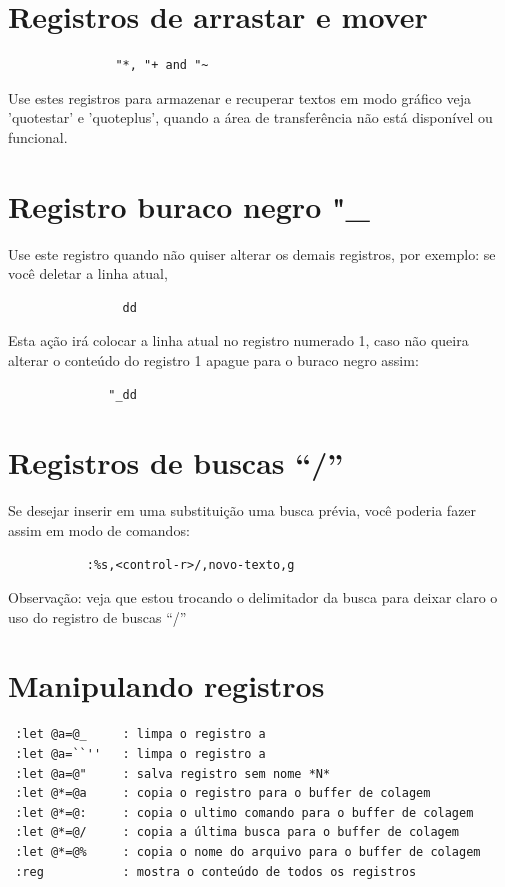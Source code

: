 \documentclass[10pt,a4paper,openany]{book}
\begin{document}
\section{Registros de arrastar e mover}
\label{Registros de arrastar e mover}

\begin{verbatim}
			   "*, "+ and "~
\end{verbatim}

Use estes registros para armazenar e recuperar textos em modo gráfico
veja 'quotestar' e 'quoteplus', quando a área de transferência não
está disponível ou funcional.

\section{Registro buraco negro "\_}
\label{Registro buraco negro}
Use este registro quando não quiser alterar os demais registros, por exemplo: se você deletar a linha atual,

\begin{verbatim}
				dd
\end{verbatim}

Esta ação irá colocar a linha atual no registro numerado 1, caso não
queira alterar o conteúdo do registro 1 apague para o buraco negro
assim:

\begin{verbatim}
			  "_dd
\end{verbatim}

\section{Registros de buscas ``/''}
\label{Registros de buscas ``/''}

Se desejar inserir em uma substituição uma busca prévia, você poderia
fazer assim em modo de comandos:

\begin{verbatim}
		   :%s,<control-r>/,novo-texto,g
\end{verbatim}

Observação: veja que estou trocando o delimitador da busca para deixar
claro o uso do registro de buscas ``/''

\section{Manipulando registros}
\label{Manipulando registros}

\begin{verbatim}
 :let @a=@_     : limpa o registro a
 :let @a=``''   : limpa o registro a
 :let @a=@"     : salva registro sem nome *N*
 :let @*=@a     : copia o registro para o buffer de colagem
 :let @*=@:     : copia o ultimo comando para o buffer de colagem
 :let @*=@/     : copia a última busca para o buffer de colagem
 :let @*=@%     : copia o nome do arquivo para o buffer de colagem
 :reg           : mostra o conteúdo de todos os registros
\end{verbatim}
\end{document}
